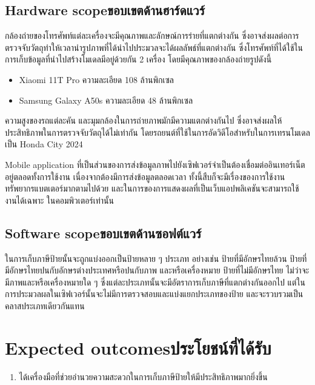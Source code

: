 \subsection{\ifenglish Hardware scope\else ขอบเขตด้านฮาร์ดแวร์\fi}

กล้องถ่ายของโทรศัพท์แต่ละเครื่องจะมีคุณภาพและลักษณ์การร่ายที่แตกต่างกัน 
ซึ่งอาจส่งผลต่อการตรวจจับวัตถุทำให้เวลานำรูปภาพที่ได้นำไปประมวลจะได้ผลลัพธ์ที่แตกต่างกัน 
ซึ่งโทรศัพท์ที่ได้ใช้ในการเก็บข้อมูลที่นำไปสร้างโมเดลมีอยู่ด้วยกัน 2 เครื่อง โดยมีคุณภาพของกล้องถ่ายรูปดังนี้
\begin{itemize}
    \item Xiaomi 11T Pro ความละเอียด 108 ล้านพิกเซล 
    \item Samsung Galaxy A50s ความละเอียด 48 ล้านพิกเซล 
\end{itemize}

ความสูงของรถแต่ละคัน และมุมกล้องในการถ่ายภาพมักมีความแตกต่างกันไป ซึ่งอาจส่งผลให้ประสิทธิภาพในการตรวจจับวัตถุได้ไม่เท่ากัน 
โดยรถยนต์ที่ใช้ในการอัดวิดีโอสำหรับในการเทรนโมเดลเป็น Honda City 2024 

Mobile application ที่เป็นส่วนของการส่งข้อมูลภาพไปยังเซิฟเวอร์จำเป็นต้องเชื่อมต่ออินเทอร์เน็ตอยู่ตลอดทั้งการใช้งาน เนื่องจากต้องมีการส่งข้อมูลตลอดเวลา 
ทั้งนี้สืบก็จะมีเรื่องของการใช้งานทรัพยากรแบตเตอร์มากตามไปด้วย และในการของการแสดงผลที่เป็นเว็บแอปพลิเคชันจะสามารถใช้งานได้เฉพาะ
ในคอมพิวเตอร์เท่านั้น 

\subsection{\ifenglish Software scope\else ขอบเขตด้านซอฟต์แวร์\fi}

ในการเก็บภาษีป้ายนั้นจะถูกแบ่งออกเป็นป้ายหลาย ๆ ประเภท อย่างเช่น ป้ายที่มีอักษรไทยล้วน ป้ายที่มีอักษรไทยปนกับอักษรต่างประเทศหรือปนกับภาพ 
และหรือเครื่องหมาย ป้ายที่ไม่มีอักษรไทย ไม่ว่าจะมีภาพและหรือเครื่องหมายใด ๆ ซึ่งแต่ละประเภทนั้นจะมีอัตราการเก็บภาษีที่แตกต่างกันออกไป 
แต่ในการประมวลผลในเซิฟเวอร์นั้นจะไม่มีการตรวจสอบและแบ่งแยกประเภทของป้าย และจะรวบรวมเป็นคลาสประเภทเดียวกันแทน 

\section{\ifenglish Expected outcomes\else ประโยชน์ที่ได้รับ\fi}
\begin{enumerate}
    \item ได้เครื่องมือที่ช่วยอำนวยความสะดวกในการเก็บภาษีป้ายให้มีประสิทธิภาพมากยิ่งขึ้น
\end{enumerate}

